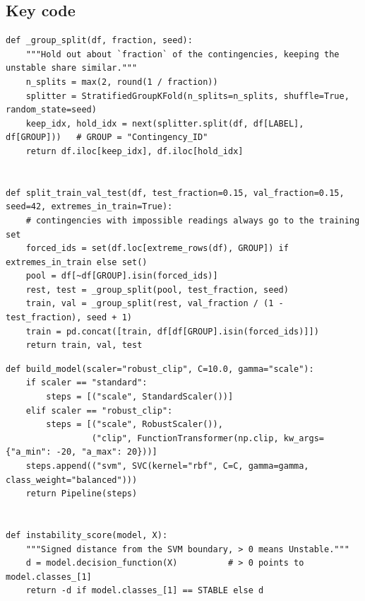 \documentclass[11pt,a4paper]{article}
\newcommand{\code}[1]{\texttt{#1}}
\begin{document}
\subsection{Key code}
\begin{lstlisting}[caption={Split by contingency into training, validation and test sets (\code{data.py}).}]
def _group_split(df, fraction, seed):
    """Hold out about `fraction` of the contingencies, keeping the unstable share similar."""
    n_splits = max(2, round(1 / fraction))
    splitter = StratifiedGroupKFold(n_splits=n_splits, shuffle=True, random_state=seed)
    keep_idx, hold_idx = next(splitter.split(df, df[LABEL], df[GROUP]))   # GROUP = "Contingency_ID"
    return df.iloc[keep_idx], df.iloc[hold_idx]


def split_train_val_test(df, test_fraction=0.15, val_fraction=0.15, seed=42, extremes_in_train=True):
    # contingencies with impossible readings always go to the training set
    forced_ids = set(df.loc[extreme_rows(df), GROUP]) if extremes_in_train else set()
    pool = df[~df[GROUP].isin(forced_ids)]
    rest, test = _group_split(pool, test_fraction, seed)
    train, val = _group_split(rest, val_fraction / (1 - test_fraction), seed + 1)
    train = pd.concat([train, df[df[GROUP].isin(forced_ids)]])
    return train, val, test
\end{lstlisting}

\begin{lstlisting}[caption={Scaler and RBF-kernel SVM in one pipeline (\code{model.py}).}]
def build_model(scaler="robust_clip", C=10.0, gamma="scale"):
    if scaler == "standard":
        steps = [("scale", StandardScaler())]
    elif scaler == "robust_clip":
        steps = [("scale", RobustScaler()),
                 ("clip", FunctionTransformer(np.clip, kw_args={"a_min": -20, "a_max": 20}))]
    steps.append(("svm", SVC(kernel="rbf", C=C, gamma=gamma, class_weight="balanced")))
    return Pipeline(steps)


def instability_score(model, X):
    """Signed distance from the SVM boundary, > 0 means Unstable."""
    d = model.decision_function(X)          # > 0 points to model.classes_[1]
    return -d if model.classes_[1] == STABLE else d
\end{lstlisting}
\end{document}
